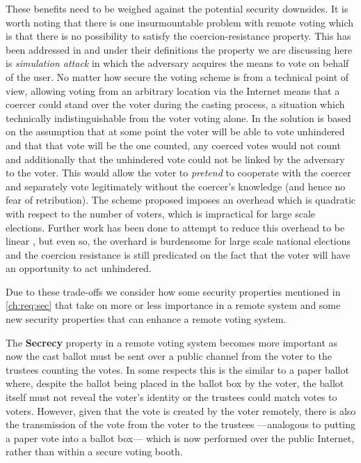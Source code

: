 These benefits need to be weighed against the potential security downsides. It is worth noting that there is one insurmountable problem with remote voting which is that there is no possibility to satisfy the coercion-resistance property. This has been addressed in \cite{juelsCoercionResistantElectronicElections2002} and under their definitions the property we are discussing here is \emph{simulation attack} in which the adversary acquires the means to vote on behalf of the user. No matter how secure the voting scheme is from a technical point of view, allowing voting from an arbitrary location via the Internet means that a coercer could stand over the voter during the casting process, a situation which technically indistinguishable from the voter voting alone. In \cite{juelsCoercionResistantElectronicElections2002} the solution is based on the assumption that at some point the voter will be able to vote unhindered and that that vote will be the one counted, any coerced votes would not count and additionally that the unhindered vote could not be linked by the adversary to the voter. This would allow the voter to \emph{pretend} to cooperate with the coercer and separately vote legitimately without the coercer's knowledge (and hence no fear of retribution). The scheme proposed imposes an overhead which is quadratic with respect to the number of voters, which is impractical for large scale elections. Further work has been done to attempt to reduce this overhead to be linear \cite{weberCoercionResistantElectronicElections2007a}, but even so, the overhard is burdensome for large scale national elections and the coercion resistance is still predicated on the fact that the voter will have an opportunity to act unhindered.

Due to these trade-offs we consider how some security properties mentioned in \autoref{ch:req:sec} that take on more or less importance in a remote system and some new security properties that can enhance a remote voting system.

The \textbf{Secrecy} property in a remote voting system becomes more important as now the cast ballot must be sent over a public channel from the voter to the trustees counting the votes. In some respects this is the similar to a paper ballot where, despite the ballot being placed in the ballot box by the voter, the ballot itself must not reveal the voter's identity or the trustees could match votes to voters. However, given that the vote is created by the voter remotely, there is also the transmission of the vote from the voter to the trustees ---analogous to putting a paper vote into a ballot box--- which is now performed over the public Internet, rather than within a secure voting booth.

